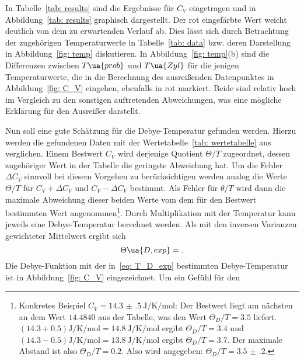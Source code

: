 

In Tabelle~\ref{tab: results} sind die Ergebnisse für $C_V$ eingetragen und in Abbildung~\ref{tab: results} graphisch dargestellt.
Der rot eingefärbte Wert weicht deutlich von dem zu erwartenden Verlauf ab. Dies lässt sich durch Betrachtung der
zugehörigen Temperaturwerte in Tabelle~\ref{tab: data} bzw. deren Darstellung in Abbildung~\ref{fig: temp} diskutieren. In Abbildung~\ref{fig: temp}(b)
sind die Differenzen zwischen $T\ua{prob}$ und $T\ua{Zyl}$ für die jenigen Temperaturwerte, die in die Berechnung des
ausreißenden Datenpunktes in Abbildung~\ref{fig: C_V} eingehen, ebenfalls in rot markiert. Beide sind relativ hoch im Vergleich zu den
sonstigen auftretenden Abweichungen, was eine mögliche Erklärung für den Ausreißer darstellt.

Nun soll eine gute Schätzung für die Debye-Temperatur gefunden werden. Hierzu werden die gefundenen Daten mit der
Wertetabelle~\ref{tab: wertetabelle} aus~\cite{anleitungV47} verglichen. Einem Bestwert $C_V$ wird derjenige Quotient $\Theta / T$ zugeordnet, dessen
zugehöriger Wert in der Tabelle die geringste Abweichung hat. Um die Fehler $\Delta C_V$ sinnvoll bei diesem
Vorgehen zu berücksichtigen werden analog die Werte $\Theta / T$ für $C_V + \Delta C_V$ und $C_V - \Delta C_V$ bestimmt.
Als Fehler für $\theta / T$ wird dann die maximale Abweichung dieser beiden Werte vom dem für den Bestwert bestimmten
Wert angenommen\footnote{Konkretes Beispiel $C_V = \SI{14.3(5)}{\joule\per\kelvin\per\mol}$:
Der Bestwert liegt am nächsten an dem Wert $\num{14.4840}$ aus der Tabelle, was den Wert $\Theta_D / T = \num{3.5}$ liefert.
$(\num{14.3} + \num{0.5})\si{\joule\per\kelvin\per\mol} = \SI{14.8}{\joule\per\kelvin\per\mol}$ ergibt $\Theta_D / T = \num{3.4}$ und
$(\num{14.3} - \num{0.5})\si{\joule\per\kelvin\per\mol} = \SI{13.8}{\joule\per\kelvin\per\mol}$ ergibt $\Theta_D / T = \num{3.7}$. Der maximale
Abstand ist also $\Theta_D / T = \num{0.2}$. Also wird angegeben: $\Theta_D / T = \num{3.5(2)}$.

}. Durch Multiplikation mit der Temperatur kann jeweils eine Debye-Temperatur berechnet werden.
Als mit den inversen Varianzen gewichteter Mittelwert ergibt sich
\begin{equation}
        \Theta\ua{D, exp} = .
        \label{eq: T_D_exp}
\end{equation}
Die Debye-Funktion mit der in~\eqref{eq: T_D_exp} bestimmten Debye-Temperatur ist in Abbildung~\ref{fig: C_V} eingezeichnet. Um ein Gefühl für den
